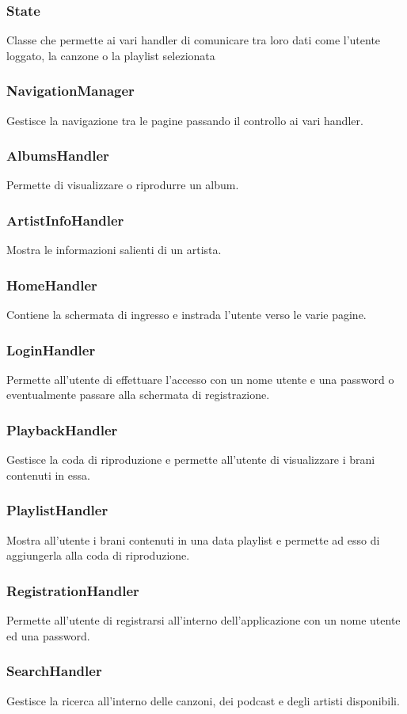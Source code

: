 \documentclass{article}
\begin{document}
\subsubsection{State}
Classe che permette ai vari handler di comunicare tra loro dati come
l'utente loggato, la canzone o la playlist selezionata
\subsubsection{NavigationManager}
Gestisce la navigazione tra le pagine passando il controllo ai vari handler.
\subsubsection{AlbumsHandler}
Permette di visualizzare o riprodurre un album.
\subsubsection{ArtistInfoHandler}
Mostra le informazioni salienti di un artista.
\subsubsection{HomeHandler}
Contiene la schermata di ingresso e instrada l'utente verso le varie pagine.
\subsubsection{LoginHandler}
Permette all'utente di effettuare l'accesso con un nome utente e una password o
eventualmente passare alla schermata di registrazione.
\subsubsection{PlaybackHandler}
Gestisce la coda di riproduzione e permette all'utente di visualizzare i
brani contenuti in essa.
\subsubsection{PlaylistHandler}
Mostra all'utente i brani contenuti in una data playlist e permette ad esso di
aggiungerla alla coda di riproduzione.
\subsubsection{RegistrationHandler}
Permette all'utente di registrarsi all'interno dell'applicazione con un
nome utente ed una password.
\subsubsection{SearchHandler}
Gestisce la ricerca all'interno delle canzoni, dei podcast e degli artisti disponibili.
\end{document}
